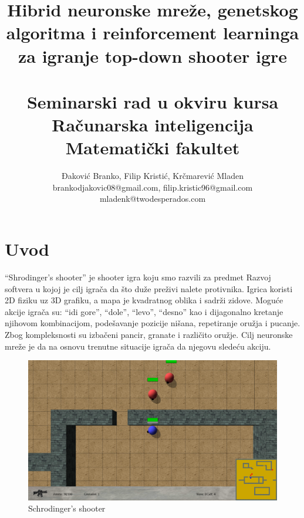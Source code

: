 \documentclass[a4paper]{article}
\begin{document}
\title{Hibrid neuronske mreže, genetskog algoritma i reinforcement learninga za igranje top-down shooter igre\\~\\ \small{Seminarski rad u okviru kursa\\Računarska inteligencija\\ Matematički fakultet}}
\author{Đaković Branko, Filip Kristić, Krčmarević Mladen\\brankodjakovic08@gmail.com, filip.kristic96@gmail.com\\ mladenk@twodesperados.com}

\maketitle

\tableofcontents

\newpage

\section{Uvod}
\label{sec:uvod}
\par “Shrodinger's shooter” je shooter igra koju smo razvili za predmet Razvoj softvera u kojoj je cilj igrača da što duže preživi nalete protivnika. Igrica koristi 2D fiziku uz 3D grafiku, a mapa je kvadratnog oblika i sadrži zidove. Moguće akcije igrača su: “idi gore”, “dole”, “levo”, “desno” kao i dijagonalno kretanje njihovom kombinacijom, podešavanje pozicije nišana, repetiranje oružja i pucanje. Zbog kompleksnosti su izbačeni pancir, granate i različito oružje. Cilj neuronske mreže\cite{neural} je da na osnovu trenutne situacije igrača da njegovu sledeću akciju. 
\begin{figure}[h!]
	\begin{center}
		\includegraphics[scale=0.18]{igra.png}
	\end{center}
	\caption{Schrodinger's shooter}
	\label{fig:igra}
\end{figure}
  
\end{document}
